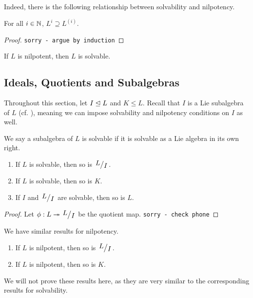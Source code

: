 Indeed, there is the following relationship between solvability and nilpotency.

\begin{lemma}
    For all $i \in \mathbb{N}$, $L^i \supseteq L^{(i)}$.
\end{lemma}
\begin{proof}
    \verb|sorry - argue by induction|
\end{proof}

\begin{boxcorollary}
    If $L$ is nilpotent, then $L$ is solvable.
\end{boxcorollary}

\subsection{Ideals, Quotients and Subalgebras}

Throughout this section, let $I \trianglelefteq L$ and $K \leq L$. Recall that $I$ is a Lie subalgebra of $L$ (cf. ), meaning we can impose solvability and nilpotency conditions on $I$ as well.

\begin{definition}
    We say a subalgebra of $L$ is solvable if it is solvable as a Lie algebra in its own right.
\end{definition}

\begin{boxproposition}
    \hfill
    \begin{enumerate}[label = \normalfont\arabic*., noitemsep]
        \item If $L$ is solvable, then so is $\quotient{L}{I}$.
        \item If $L$ is solvable, then so is $K$.
        \item If $I$ and $\quotient{L}{I}$ are solvable, then so is $L$.
    \end{enumerate}
\end{boxproposition}
\begin{proof}
    Let $\phi : L \surj \quotient{L}{I}$ be the quotient map. \verb|sorry - check phone|
\end{proof}

We have similar results for nilpotency.

\begin{boxproposition}
    \hfill
    \begin{enumerate}[label = \normalfont\arabic*., noitemsep]
        \item If $L$ is nilpotent, then so is $\quotient{L}{I}$.
        \item If $L$ is nilpotent, then so is $K$.
    \end{enumerate}
\end{boxproposition}

We will not prove these results here, as they are very similar to the corresponding results for solvability.
